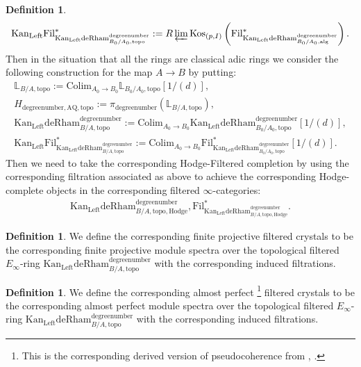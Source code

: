 \documentclass[11pt]{book}
\theoremstyle{definition}
\newtheorem{definition}[theorem]{Definition}
\numberwithin{equation}{section}
\begin{document}
\begin{definition}
\begin{align}
\mathrm{Kan}_\mathrm{Left}\mathrm{Fil}^*_{\mathrm{Kan}_\mathrm{Left}\mathrm{deRham}^\text{degreenumber}_{B_0/A_0,\mathrm{topo}}}:=R\varprojlim \mathrm{Kos}_{(p,I)}\left(\mathrm{Fil}^*_{\mathrm{Kan}_\mathrm{Left}\mathrm{deRham}^\text{degreenumber}_{B_0/A_0,\mathrm{alg}}}\right).	
\end{align}
Then in the situation that all the rings are classical adic rings we consider the following construction for the map $A\rightarrow B$ by putting:
\begin{align}
\mathbb{L}_{B/A,\mathrm{topo}}:= \mathrm{Colim}_{A_0\rightarrow B_0}\mathbb{L}_{B_0/A_0,\mathrm{topo}}[1/(d)],\\
H_{\text{degreenumber},{\mathrm{AQ}},\mathrm{topo}}:=\pi_\text{degreenumber} (\mathbb{L}_{B/A,\mathrm{topo}}),	\\
\mathrm{Kan}_\mathrm{Left}\mathrm{deRham}^\text{degreenumber}_{B/A,\mathrm{topo}}:=\mathrm{Colim}_{A_0\rightarrow B_0}\mathrm{Kan}_\mathrm{Left}\mathrm{deRham}^\text{degreenumber}_{B_0/A_0,\mathrm{topo}}[1/(d)],\\
\mathrm{Kan}_\mathrm{Left}\mathrm{Fil}^*_{\mathrm{Kan}_\mathrm{Left}\mathrm{deRham}^\text{degreenumber}_{B/A,\mathrm{topo}}}:=\mathrm{Colim}_{A_0\rightarrow B_0}\mathrm{Fil}^*_{\mathrm{Kan}_\mathrm{Left}\mathrm{deRham}^\text{degreenumber}_{B_0/A_0,\mathrm{topo}}}[1/(d)].
\end{align}
Then we need to take the corresponding Hodge-Filtered completion by using the corresponding filtration associated as above to achieve the corresponding Hodge-complete objects in the corresponding filtered $\infty$-categories:
\begin{align}
\mathrm{Kan}_\mathrm{Left}{\mathrm{deRham}}^\text{degreenumber}_{B/A,\mathrm{topo,Hodge}},\mathrm{Fil}^*_{\mathrm{Kan}_\mathrm{Left}{\mathrm{deRham}}^\text{degreenumber}_{B/A,\mathrm{topo,Hodge}}}.	
\end{align}
\end{definition}



\begin{definition}
We define the corresponding finite projective filtered crystals to be the corresponding finite projective module spectra over the topological filtered $E_\infty$-ring $\mathrm{Kan}_\mathrm{Left}\mathrm{deRham}^\text{degreenumber}_{B/A,\mathrm{topo}}$ with the corresponding induced filtrations.	
\end{definition}


\begin{definition}
We define the corresponding almost perfect \footnote{This is the corresponding derived version of pseudocoherence from \cite{12Lu1}, \cite{12Lu2}.} filtered crystals to be the corresponding almost perfect module spectra over the topological filtered $E_\infty$-ring $\mathrm{Kan}_\mathrm{Left}\mathrm{deRham}^\text{degreenumber}_{B/A,\mathrm{topo}}$ with the corresponding induced filtrations.	
\end{definition}
\end{document}
